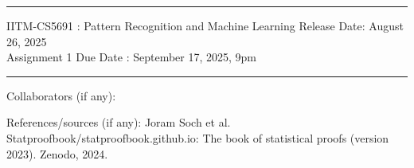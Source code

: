 \documentclass[solution,addpoints,12pt]{exam}
\begin{document}
\hrule
\vspace{3mm}
\noindent 
{\sf IITM-CS5691 : Pattern Recognition and Machine Learning  \hfill Release Date: August 26, 2025}
\\
\noindent 
{\sf Assignment 1 \hfill Due Date : September 17, 2025, 9pm}
\vspace{3mm}
\hrule
\vspace{3mm}

\noindent
{{\sf Collaborators (if any): }} %

\noindent
{{\sf References/sources (if any): Joram Soch et al. Statproofbook/statproofbook.github.io: The book of statistical proofs (version 2023).
		Zenodo, 2024.
}} %
\end{document}
